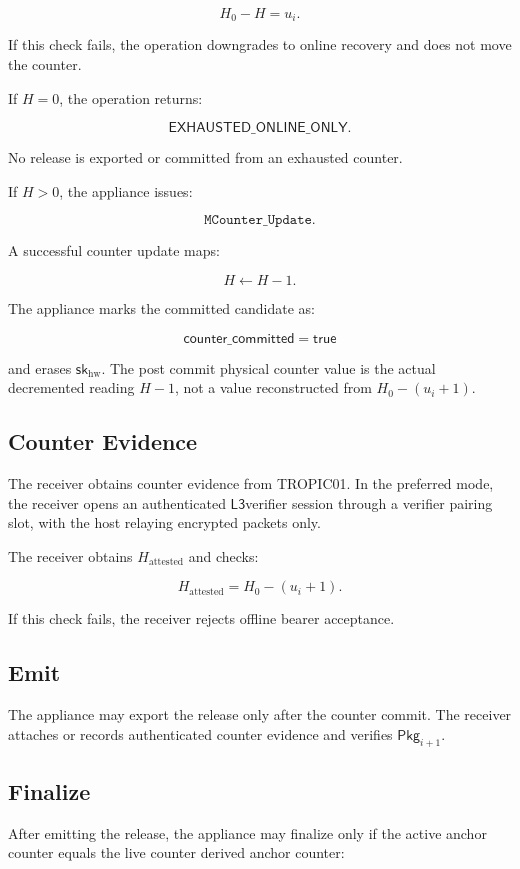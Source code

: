 \documentclass[11pt]{article}
\theoremstyle{definition}
\theoremstyle{remark}
\newcommand{\Lthree}{\ensuremath{\mathsf{L3}}}
\newcommand{\Pkg}{\ensuremath{\mathsf{Pkg}}}
\newcommand{\skhw}{\ensuremath{\mathsf{sk}_{\mathrm{hw}}}}
\newcommand{\UpdateCmd}{\texttt{MCounter\_Update}}
\begin{document}
\[
H_0-H=u_i.
\]

If this check fails, the operation downgrades to online recovery and does not move the counter.

If \(H=0\), the operation returns:

\[
\mathsf{EXHAUSTED\_ONLINE\_ONLY}.
\]

No release is exported or committed from an exhausted counter.

If \(H>0\), the appliance issues:

\[
\UpdateCmd.
\]

A successful counter update maps:

\[
H\leftarrow H-1.
\]

The appliance marks the committed candidate as:

\[
\mathsf{counter\_committed}=\mathsf{true}
\]

and erases \(\skhw\). The post commit physical counter value is the actual decremented reading
\(H-1\), not a value reconstructed from \(H_0-(u_i+1)\).

\subsection{Counter Evidence}

The receiver obtains counter evidence from TROPIC01. In the preferred mode, the receiver opens an
authenticated \Lthree verifier session through a verifier pairing slot, with the host relaying
encrypted packets only.

The receiver obtains \(H_{\mathrm{attested}}\) and checks:

\[
H_{\mathrm{attested}}=H_0-(u_i+1).
\]

If this check fails, the receiver rejects offline bearer acceptance.

\subsection{Emit}

The appliance may export the release only after the counter commit. The receiver attaches or
records authenticated counter evidence and verifies \(\Pkg_{i+1}\).

\subsection{Finalize}

After emitting the release, the appliance may finalize only if the active anchor counter equals
the live counter derived anchor counter:
\end{document}
